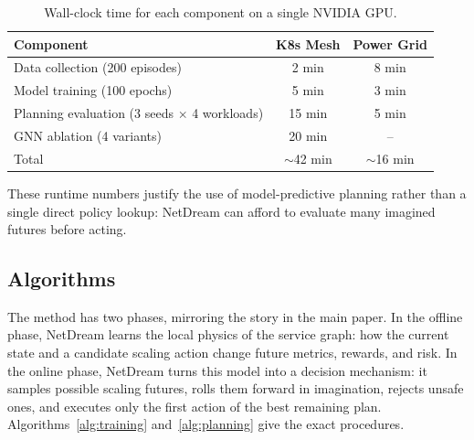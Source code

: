 \begin{table}[H]
\centering
\small
\caption{Wall-clock time for each component on a single NVIDIA GPU.}
\label{tab:compute}
\begin{tabular}{@{}lcc@{}}
\toprule
Component & K8s Mesh & Power Grid \\
\midrule
Data collection (200 episodes) & 2 min & 8 min \\
Model training (100 epochs) & 5 min & 3 min \\
Planning evaluation (3 seeds $\times$ 4 workloads) & 15 min & 5 min \\
GNN ablation (4 variants) & 20 min & -- \\
\midrule
Total & $\sim$42 min & $\sim$16 min \\
\bottomrule
\end{tabular}
\end{table}

These runtime numbers justify the use of model-predictive planning rather
than a single direct policy lookup: NetDream can afford to evaluate many
imagined futures before acting.

\subsection{Algorithms}
\label{app:pseudocode}

The method has two phases, mirroring the story in the main paper.  In
the offline phase, NetDream learns the local physics of the service graph:
how the current state and a candidate scaling action change future
metrics, rewards, and risk.  In the online phase, NetDream turns this
model into a decision mechanism: it samples possible scaling futures,
rolls them forward in imagination, rejects unsafe ones, and executes only
the first action of the best remaining plan.  Algorithms~\ref{alg:training}
and~\ref{alg:planning} give the exact procedures.

